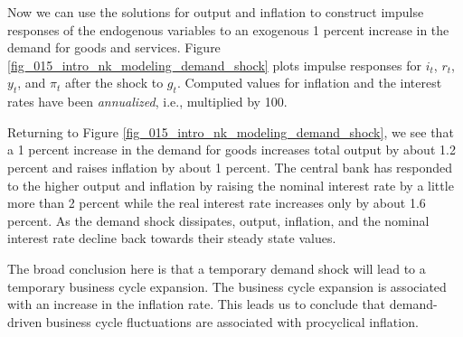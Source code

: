 \documentclass[12pt,fleqn]{article}
\newcommand{\EE}{\begin{eqnarray}}
\newcommand{\FF}{\end{eqnarray}}
\begin{document}
Now we can use the solutions for output and inflation to construct impulse responses of the endogenous variables to an exogenous 1 percent increase in the demand for goods and services. Figure \ref{fig_015_intro_nk_modeling_demand_shock} plots impulse responses for $i_t$, $r_t$, $y_t$, and $\pi_t$ after the shock to $g_t$. Computed values for inflation and the interest rates have been \emph{annualized}, i.e., multiplied by 100.




Returning to Figure \ref{fig_015_intro_nk_modeling_demand_shock}, we see that a 1 percent increase in the demand for goods increases total output by about 1.2 percent and raises inflation by about 1 percent. The central bank has responded to the higher output and inflation by raising the nominal interest rate by a little more than 2 percent while the real interest rate increases only by about 1.6 percent. As the demand shock dissipates, output, inflation, and the nominal interest rate decline back towards their steady state values.

The broad conclusion here is that a temporary demand shock will lead to a temporary business cycle expansion. The business cycle expansion is associated with an increase in the inflation rate. This leads us to conclude that demand-driven business cycle fluctuations are associated with procyclical inflation.
\end{document}
